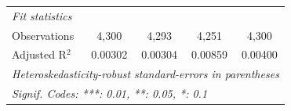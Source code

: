 \begin{tabular}{lcccc}
   \midrule
   \emph{Fit statistics}\\
   Observations                      & 4,300           & 4,293          & 4,251          & 4,300\\  
   Adjusted R$^2$                    & 0.00302         & 0.00304        & 0.00859        & 0.00400\\  
   \midrule \midrule
   \multicolumn{5}{l}{\emph{Heteroskedasticity-robust standard-errors in parentheses}}\\
   \multicolumn{5}{l}{\emph{Signif. Codes: ***: 0.01, **: 0.05, *: 0.1}}\\
\end{tabular}
\par\endgroup


